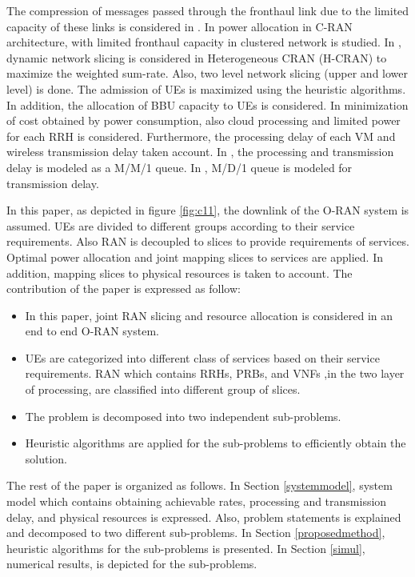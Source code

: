 \documentclass[conference]{IEEEtran}
\begin{document}
The compression of messages passed through the fronthaul link due to the limited capacity of these links is considered in \cite{simeone2016cloud,1111}. 
In \cite{motalleb2017optimal} power allocation in C-RAN architecture, with limited fronthaul capacity in clustered network is studied.
In \cite{lee2018dynamic}, dynamic network slicing is considered in Heterogeneous CRAN (H-CRAN) to maximize the weighted sum-rate. Also, two level network slicing (upper and lower level) is done. The admission of UEs is maximized using the heuristic algorithms. In addition, the allocation of BBU capacity to UEs is considered.\newline
In \cite{frdl,luong2018novel,luong2018novel1,guo2016exploiting} minimization of cost obtained by power consumption, also cloud processing and limited power for each RRH is considered. Furthermore, the processing delay of each VM and wireless transmission delay taken account. In \cite{frdl}, the processing and transmission delay is modeled as 
a M/M/1 queue. In \cite{guo2016exploiting}, M/D/1 queue is modeled for transmission delay.

In this paper, as  depicted in figure \ref{fig:c11}, the downlink of the O-RAN system is assumed. UEs are divided to different groups according to 
their service requirements. Also RAN is decoupled to slices to provide requirements of services. Optimal power allocation and joint mapping slices to services are applied. In addition, mapping slices to physical resources is taken to account.\newline
The contribution of the paper is expressed as follow:
\begin{itemize}
\item In this paper, joint RAN slicing and resource allocation is considered in an end to end O-RAN system.
\item UEs are categorized into different class of services based on their service requirements. RAN which contains RRHs, PRBs, and VNFs ,in the two layer of processing, are classified into different group of slices.  
\item The problem is decomposed into two independent sub-problems. 
\item Heuristic algorithms are applied for the sub-problems to efficiently obtain the solution.
\end{itemize}

The rest of the paper is organized as follows. In Section \ref{systemmodel}, system model which contains obtaining achievable rates, processing and transmission delay, and physical resources is expressed. Also, problem statements is explained and decomposed to two
different sub-problems. 
In Section \ref{proposedmethod}, heuristic algorithms for the sub-problems is presented. In Section \ref{simul}, numerical results, is depicted for the sub-problems.
\end{document}
